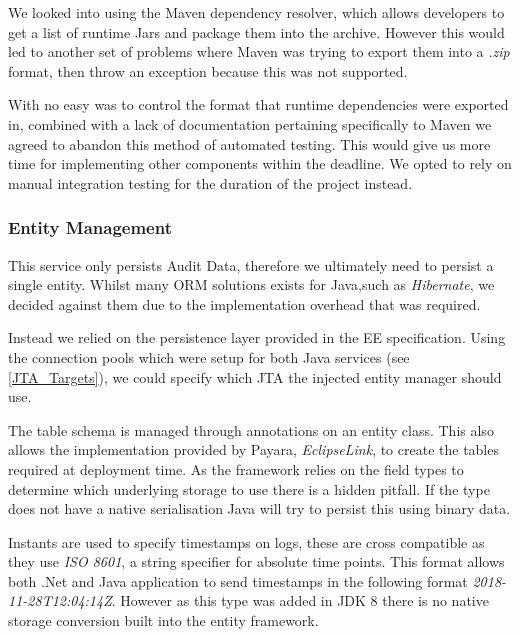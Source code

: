         \par
        We looked into using the Maven dependency resolver, which allows developers to get a list of runtime Jars and package them into the archive. However this would led to another set of problems where Maven was trying to export them into a \textit{.zip} format, then throw an exception because this was not supported.

        \par
        With no easy was to control the format that runtime dependencies were exported in, combined with a lack of documentation pertaining specifically to Maven we agreed to abandon this method of automated testing. This would give us more time for implementing other components within the deadline. We opted to rely on manual integration testing for the duration of the project instead.

        \subsubsection{Entity Management}
        This service only persists Audit Data, therefore we ultimately need to persist a single entity. Whilst many ORM solutions exists for Java,such as \textit{Hibernate}, we decided against them due to the implementation overhead that was required.

        \par
        Instead we relied on the persistence layer provided in the EE specification. Using the connection pools which were setup for both Java services (see \ref{JTA_Targets}), we could specify which JTA the injected entity manager should use.

        \par
        The table schema is managed through annotations on an entity class. This also allows the implementation provided by Payara, \textit{EclipseLink}, to create the tables required at deployment time. As the framework relies on the field types to determine which underlying storage to use there is a hidden pitfall. If the type does not have a native serialisation Java will try to persist this using binary data.

        \par
        Instants are used to specify timestamps on logs, these are cross compatible as they use \textit{ISO 8601}\cite{ISO_8601}, a string specifier for absolute time points. This format allows both .Net and Java application to send timestamps in the following format \textit{2018-11-28T12:04:14Z}. However as this type was added in JDK 8 there is no native storage conversion built into the entity framework.

